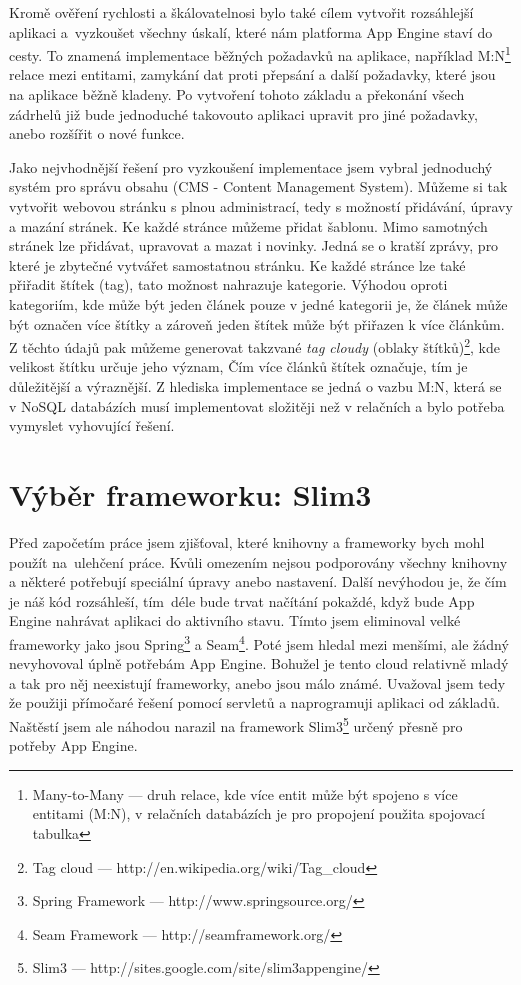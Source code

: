 Kromě ověření rychlosti a škálovatelnosi bylo také cílem vytvořit rozsáhlejší aplikaci a~vyzkoušet všechny úskalí, které nám platforma App Engine staví do cesty. To znamená implementace běžných požadavků na aplikace, například M:N\footnote{Many-to-Many --- druh relace, kde více entit může být spojeno s více entitami (M:N), v relačních databázích je pro propojení použita spojovací tabulka} relace mezi entitami, zamykání dat proti přepsání a další požadavky, které jsou na aplikace běžně kladeny. Po vytvoření tohoto základu a překonání všech zádrhelů již bude jednoduché takovouto aplikaci upravit pro jiné požadavky, anebo rozšířit o nové funkce.

Jako nejvhodnější řešení pro vyzkoušení implementace jsem vybral jednoduchý systém pro správu obsahu (CMS - Content Management System). Můžeme si tak vytvořit webovou  stránku s plnou administrací, tedy s možností přidávání, úpravy a mazání stránek. Ke každé stránce můžeme přidat šablonu. Mimo samotných stránek lze přidávat, upravovat a mazat i novinky. Jedná se o kratší zprávy, pro které je zbytečné vytvářet samostatnou stránku. Ke každé stránce lze také přiřadit štítek (tag), tato možnost nahrazuje kategorie. Výhodou oproti kategoriím, kde může být jeden článek pouze v jedné kategorii je, že článek může být označen více štítky a zároveň jeden štítek může být přiřazen k více článkům. Z těchto údajů pak můžeme generovat takzvané \emph{tag cloudy} (oblaky štítků)\footnote{Tag cloud --- http://en.wikipedia.org/wiki/Tag\_cloud}, kde velikost štítku určuje jeho význam, Čím více článků štítek označuje, tím je důležitější a výraznější. Z hlediska implementace se jedná o vazbu M:N, která se v NoSQL databázích musí implementovat složitěji než v relačních a bylo potřeba vymyslet vyhovující řešení.

\section{Výběr frameworku: Slim3}
Před započetím práce jsem zjišťoval, které knihovny a frameworky bych mohl použít na~ulehčení práce. Kvůli omezením nejsou podporovány všechny knihovny a některé potřebují speciální úpravy anebo nastavení. Další nevýhodou je, že čím je náš kód rozsáhleší, tím~déle bude trvat načítání pokaždé, když bude App Engine nahrávat aplikaci do aktivního stavu. Tímto jsem eliminoval velké frameworky jako jsou Spring\footnote{Spring Framework --- http://www.springsource.org/} a Seam\footnote{Seam Framework --- http://seamframework.org/}. Poté jsem hledal mezi menšími, ale žádný nevyhovoval úplně potřebám App Engine. Bohužel je tento cloud relativně mladý a tak pro něj neexistují frameworky, anebo jsou málo známé. Uvažoval jsem tedy že použiji přímočaré řešení pomocí servletů a naprogramuji aplikaci od základů. Naštěstí jsem ale náhodou narazil na framework Slim3\footnote{Slim3 --- http://sites.google.com/site/slim3appengine/} určený přesně pro potřeby App Engine.

